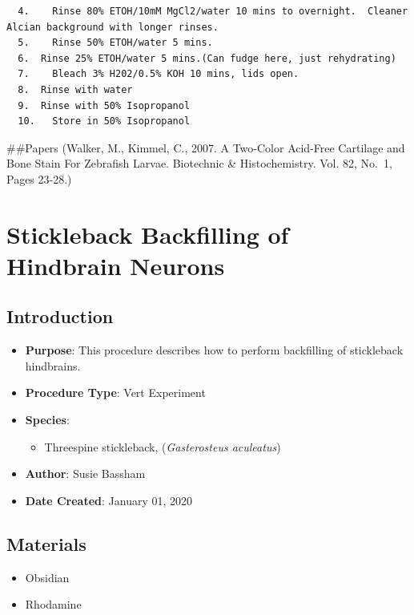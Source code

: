\documentclass[
  letterpaper,
  DIV=11,
  numbers=noendperiod]{scrreprt}
\providecommand{\tightlist}{%
  \setlength{\itemsep}{0pt}\setlength{\parskip}{0pt}}\usepackage{longtable,booktabs,array}
\begin{document}
\begin{verbatim}
  4.    Rinse 80% ETOH/10mM MgCl2/water 10 mins to overnight.  Cleaner Alcian background with longer rinses.
  5.    Rinse 50% ETOH/water 5 mins.
  6.  Rinse 25% ETOH/water 5 mins.(Can fudge here, just rehydrating)
  7.    Bleach 3% H202/0.5% KOH 10 mins, lids open.
  8.  Rinse with water
  9.  Rinse with 50% Isopropanol
  10.   Store in 50% Isopropanol
\end{verbatim}

\#\#Papers (Walker, M., Kimmel, C., 2007. A Two-Color Acid-Free
Cartilage and Bone Stain For Zebrafish Larvae. Biotechnic \&
Histochemistry. Vol. 82, No.~1, Pages 23-28.)

\hypertarget{sec-vert_exp-hindbrain_backfill}{%
\chapter{Stickleback Backfilling of Hindbrain
Neurons}\label{sec-vert_exp-hindbrain_backfill}}

\hypertarget{introduction-73}{%
\section{Introduction}\label{introduction-73}}

\begin{itemize}
\tightlist
\item
  \textbf{Purpose}: This procedure describes how to perform backfilling
  of stickleback hindbrains.
\item
  \textbf{Procedure Type}: Vert Experiment
\item
  \textbf{Species}:

  \begin{itemize}
  \tightlist
  \item
    Threespine stickleback, (\emph{Gasterosteus aculeatus})
  \end{itemize}
\item
  \textbf{Author}: Susie Bassham
\item
  \textbf{Date Created}: January 01, 2020
\end{itemize}

\hypertarget{materials-69}{%
\section{Materials}\label{materials-69}}

\begin{itemize}
\tightlist
\item
  Obsidian
\item
  Rhodamine
\end{itemize}
\end{document}
